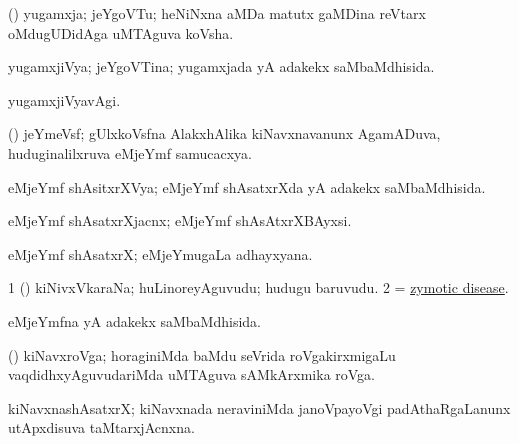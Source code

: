\bentry
{}  
\gl{\nA} 
\bmng
(\jiVvi) yugamxja; jeYgoVTu; heNiNxna aMDa matutx gaMDina reVtarx oMdugUDidAga uMTAguva koVsha.
\emng
\eentry

\bentry
{} 
\gl{\gu} 
\bmng
yugamxjiVya; jeYgoVTina; yugamxjada yA adakekx saMbaMdhisida.
\emng
\eentry

\bentry
{} 
\gl{\kirxvi} 
\bmng
yugamxjiVyavAgi.
\emng
\eentry

\bentry
{} 
\gl{\nA} 
\bmng
(\jiVra) jeYmeVsf; gUlxkoVsfna AlakxhAlika  kiNavxnavanunx AgamADuva, huduginalilxruva eMjeYmf samucacxya.
\emng
\eentry

\bentry
{} 
\gl{\gu} 
\bmng
eMjeYmf shAsitxrXVya; eMjeYmf shAsatxrXda yA adakekx saMbaMdhisida.
\emng
\eentry

\bentry
{} 
\gl{\nA} 
\bmng
eMjeYmf shAsatxrXjacnx; eMjeYmf shAsAtxrXBAyxsi.
\emng
\eentry


\bentry
{} 
\gl{\nA} 
\bmng
eMjeYmf shAsatxrX; eMjeYmugaLa adhayxyana.
\emng
\eentry

\bentry
{} 
\gl{\nA} 
\bmng
\bnum
\num{1} (\pArxparx) kiNivxVkaraNa; huLinoreyAguvudu; hudugu baruvudu.
\num{2} = \hyperlink{zymotic disease}{zymotic disease}.
\enum
\emng
\eentry

\bentry
{}  
\gl{\gu} 
\bmng
eMjeYmfna yA adakekx saMbaMdhisida.
\emng
\eentry

\bentry
{} 
\gl{\nA} 
\bmng
(\pArxparx) kiNavxroVga; horaginiMda baMdu seVrida roVgakirxmigaLu vaqdidhxyAguvudariMda uMTAguva sAMkArxmika roVga.
\emng
\eentry

\bentry
{} 
\gl{\nA} 
\bmng
kiNavxnashAsatxrX; kiNavxnada neraviniMda janoVpayoVgi padAthaRgaLanunx utApxdisuva taMtarxjAcnxna.
\emng
\eentry

%

